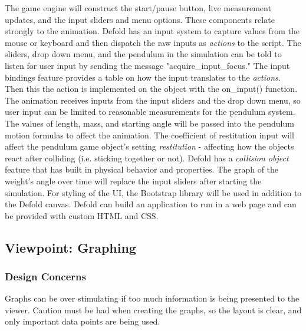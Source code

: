 \documentclass[onecolumn, draftclsnofoot,10pt, compsoc]{IEEEtran}
\begin{document}
The game engine will construct the start/pause button, live measurement updates, and the input sliders and menu options. These components relate strongly to the animation.\newline
Defold has an input system to capture values from the mouse or keyboard and then dispatch the raw inputs as \textit{actions} to the script. The sliders, drop down menu, and the pendulum in the simulation can be told to listen for user input by sending the message "acquire\_input\_focus." The input bindings feature provides a table on how the input translates to the \textit{actions}. Then this the action is implemented on the object with the on\_input() function. 
The animation receives inputs from the input sliders and the drop down menu, so user input can be limited to reasonable measurements for the pendulum system. The values of length, mass, and starting angle will be passed into the pendulum motion formulas to affect the animation. The coefficient of restitution input will affect the pendulum game object's setting \textit{restitution} - affecting how the objects react after colliding (i.e. sticking together or not). Defold has a \textit{collision object} feature that has built in physical behavior and properties. 
\newline The graph of the weight's angle over time will replace the input sliders after starting the simulation. 
For styling of the UI, the Bootstrap library will be used in addition to the Defold canvas. Defold can build an application to run in a web page and can be provided with custom HTML and CSS. 

\subsection{Viewpoint: Graphing}

\subsubsection{Design Concerns}
Graphs can be over stimulating if too much information is being presented to the viewer. Caution must be had when creating the graphs, so the layout is clear, and only important data points are being used.
\end{document}
